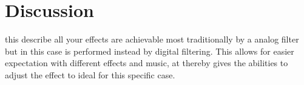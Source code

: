 
\section{Discussion}
this describe all your effects are achievable most traditionally by a analog filter but in this case is performed instead by digital filtering.
This allows for easier expectation with different effects and music, at thereby gives the abilities to adjust the effect to ideal for this specific case.

